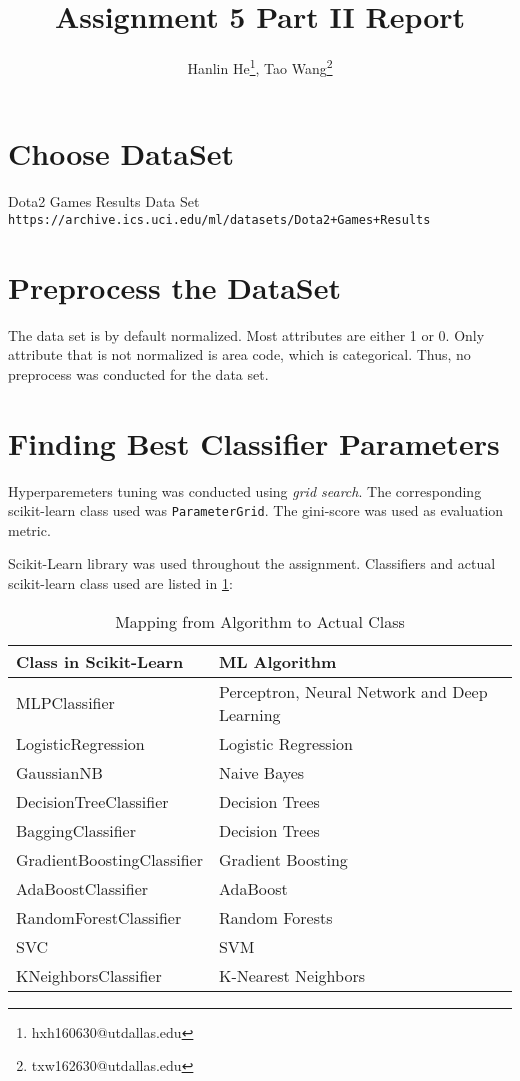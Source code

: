 \documentclass[12pt]{article}
\title{Assignment 5 Part II Report}
\author{Hanlin He\footnote{hxh160630@utdallas.edu},
Tao Wang\footnote{txw162630@utdallas.edu}}
\begin{document}
\maketitle

\section{Choose DataSet}

Dota2 Games Results Data Set
\verb|https://archive.ics.uci.edu/ml/datasets/Dota2+Games+Results|

\section{Preprocess the DataSet}

The data set is by default normalized. Most attributes are either 1 or 0.
Only attribute that is not normalized is area code, which is categorical.
Thus, no preprocess was conducted for the data set.

\section{Finding Best Classifier Parameters}

Hyperparemeters tuning was conducted using \emph{grid search}. The corresponding
scikit-learn class used was \verb|ParameterGrid|. The gini-score was used as evaluation metric.

Scikit-Learn library was used throughout the assignment.
Classifiers and actual scikit-learn class used are listed in \cref{map}:

\begin{table}[!ht]
\centering
\caption{Mapping from Algorithm to Actual Class}\label{map}
\begin{tabular}{ll}
\toprule
\bfseries Class in Scikit-Learn & \bfseries ML Algorithm \\\midrule
MLPClassifier & Perceptron, Neural Network and Deep Learning \\
LogisticRegression & Logistic Regression \\
GaussianNB & Naive Bayes \\
DecisionTreeClassifier & Decision Trees \\
BaggingClassifier & Decision Trees \\
GradientBoostingClassifier & Gradient Boosting \\
AdaBoostClassifier & AdaBoost \\
RandomForestClassifier & Random Forests \\
SVC & SVM \\
KNeighborsClassifier & K-Nearest Neighbors \\\bottomrule
\end{tabular}
\end{table}
\end{document}
